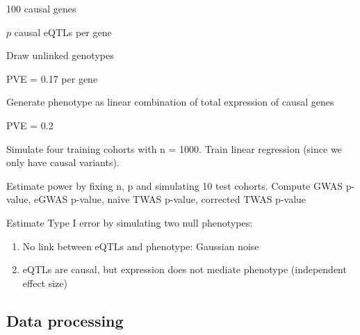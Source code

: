 \documentclass{article}
\begin{document}
100 causal genes

\(p\) causal eQTLs per gene

Draw unlinked genotypes

PVE = 0.17 per gene

Generate phenotype as linear combination of total expression of causal genes

PVE = 0.2

Simulate four training cohorts with n = 1000. Train linear regression (since we
only have causal variants).

Estimate power by fixing n, p and simulating 10 test cohorts. Compute GWAS
p-value, eGWAS p-value, naive TWAS p-value, corrected TWAS p-value

Estimate Type I error by simulating two null phenotypes:

\begin{enumerate}
\item No link between eQTLs and phenotype: Gaussian noise
\item eQTLs are causal, but expression does not mediate phenotype (independent
effect size)
\end{enumerate}

\subsection{Data processing}

\clearpage
\printbibliography
\end{document}
